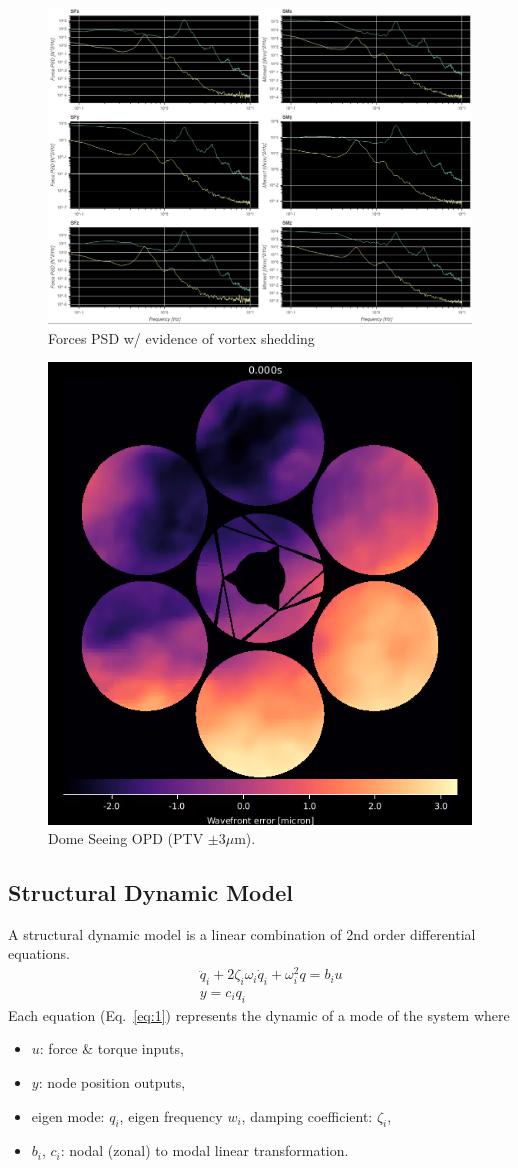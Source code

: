 \documentclass[]{AO4ELT}  %
\begin{document}
\begin{figure}
   \centering
   \includegraphics[width=0.7\linewidth,trim=0 21cm 21cm 1cm,clip]{FM_PSDs.png}
   \caption{Forces PSD w/ evidence of vortex shedding}
   \label{fig:8a}
\end{figure}
\begin{figure}
   \centering
   \includegraphics[width=0.6\linewidth]{opd.mp4.png}
   \caption{Dome Seeing OPD (PTV $\pm 3\mu$m).}
   \label{fig:8b}
\end{figure}

\clearpage

\subsection{Structural Dynamic Model}
\label{sec:fem}

A structural dynamic model is a linear combination of 2nd order differential equations.
\begin{eqnarray*}
   \label{eq:1}
   && \ddot q_i + 2\zeta_i \omega_i \dot q_i + \omega_i^2 q = b_i u \\
   && y = c_i q_i
\end{eqnarray*}
Each equation (Eq.~\ref{eq:1}) represents the dynamic of a mode of the system
where
\begin{itemize}
   \item $u$: force \& torque inputs,
   \item $y$: node position outputs,
   \item eigen mode: $q_i$, eigen frequency $w_i$, damping coefficient: $\zeta_i$,
   \item $b_i$, $c_i$: nodal (zonal) to modal linear transformation.
\end{itemize}
\end{document}
